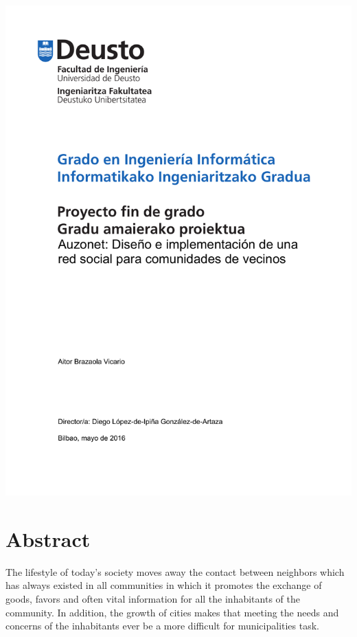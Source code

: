 \documentclass{DeustoFDP}
\begin{document}
\frontmatter
\pagestyle{plain}

\begin{titlepage}
    \includegraphics{fig/portada}
    \restoregeometry
\end{titlepage}
\cleardoublepage

\setcounter{page}{3}

\chapter*{Abstract}
The lifestyle of today's society moves away the contact between neighbors
which has always existed in all communities in which it promotes the
exchange of goods, favors and often vital information for all
the inhabitants of the community. In addition, the growth of cities makes
that meeting the needs and concerns of the inhabitants ever be a
more difficult for municipalities task.
\end{document}
